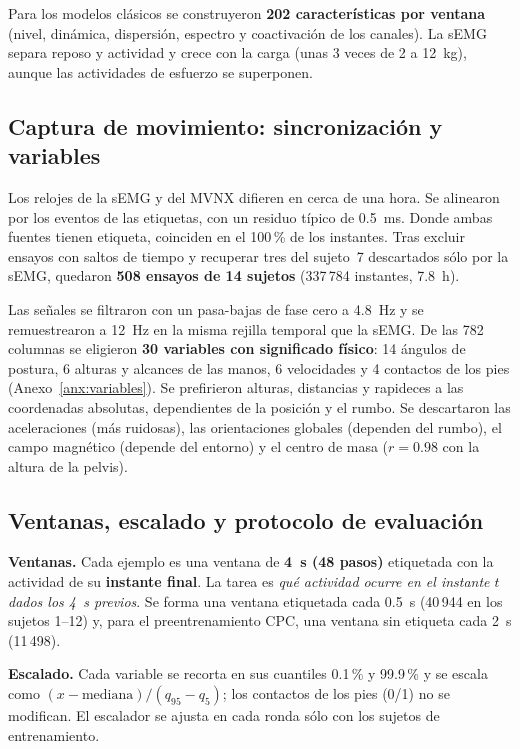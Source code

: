\documentclass[letterpaper,11pt]{article}
\begin{document}
Para los modelos clásicos se construyeron \textbf{202 características por ventana} (nivel, dinámica, dispersión, espectro y coactivación de los canales). La sEMG separa reposo y actividad y crece con la carga (unas 3 veces de 2 a 12~kg), aunque las actividades de esfuerzo se superponen.

\subsection{Captura de movimiento: sincronización y variables}
Los relojes de la sEMG y del MVNX difieren en cerca de una hora. Se alinearon por los eventos de las etiquetas, con un residuo típico de 0.5~ms. Donde ambas fuentes tienen etiqueta, coinciden en el 100\,\% de los instantes. Tras excluir ensayos con saltos de tiempo y recuperar tres del sujeto~7 descartados sólo por la sEMG, quedaron \textbf{508 ensayos de 14 sujetos} (337\,784 instantes, 7.8~h).

Las señales se filtraron con un pasa-bajas de fase cero a 4.8~Hz y se remuestrearon a 12~Hz en la misma rejilla temporal que la sEMG. De las 782 columnas se eligieron \textbf{30 variables con significado físico}: 14 ángulos de postura, 6 alturas y alcances de las manos, 6 velocidades y 4 contactos de los pies (Anexo~\ref{anx:variables}). Se prefirieron alturas, distancias y rapideces a las coordenadas absolutas, dependientes de la posición y el rumbo. Se descartaron las aceleraciones (más ruidosas), las orientaciones globales (dependen del rumbo), el campo magnético (depende del entorno) y el centro de masa ($r = 0.98$ con la altura de la pelvis).

\subsection{Ventanas, escalado y protocolo de evaluación}
\label{sec:protocolo}
\textbf{Ventanas.} Cada ejemplo es una ventana de \textbf{4~s (48 pasos)} etiquetada con la actividad de su \textbf{instante final}. La tarea es \emph{qué actividad ocurre en el instante $t$ dados los 4~s previos}. Se forma una ventana etiquetada cada 0.5~s (40\,944 en los sujetos 1--12) y, para el preentrenamiento CPC, una ventana sin etiqueta cada 2~s (11\,498).

\textbf{Escalado.} Cada variable se recorta en sus cuantiles 0.1\,\% y 99.9\,\% y se escala como $(x - \text{mediana})/(q_{95} - q_{5})$; los contactos de los pies (0/1) no se modifican. El escalador se ajusta en cada ronda sólo con los sujetos de entrenamiento.
\end{document}
